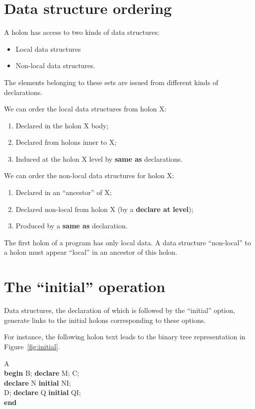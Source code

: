 \documentclass[openany,nobib]{tufte-book}
\newcommand{\kw}[1]{{\bf #1}}
\begin{document}
\section{Data structure ordering}

A holon has access to two kinds of data structures:
\begin{itemize}
    \item[(a)] Local data structures
    \item[(b)] Non-local data structures.
\end{itemize}
The elements belonging to these sets are issued from different kinds of
declarations.

We can order the local data structures from holon X:
\begin{enumerate}
    \item Declared in the holon X body;
    \item Declared from holons inner to X;
    \item Induced at the holon X level by \kw{same as} declarations.
\end{enumerate}

We can order the non-local data structures for holon X:
\begin{enumerate}
    \item Declared in an ``ancestor'' of X;
    \item Declared non-local from holon X (by a \kw{declare at level});
    \item Produced by a \kw{same as} declaration.
\end{enumerate}

The first holon of a program has only local data. A data structure
``non-local'' to a holon must appear ``local'' in an ancestor of this holon.

\section{The ``initial'' operation}

\medskip\noindent
Data structures, the declaration of which is followed by the ``initial''
option, generate links to the initial holons corresponding to these options.

For instance, the following holon text leads to the binary tree representation
in Figure~\ref{fig:initial}.

\medskip

\-\hspace{0.8cm} A\\
\-\hspace{0.8cm} \kw{begin} B; \kw{declare} M; C;\\
\-\hspace{2cm} \kw{declare} N \kw{initial} NI;\\
\-\hspace{2.5cm} D; \kw{declare} Q \kw{initial} QI;\\
\-\hspace{1.2cm} \kw{end}\\
\end{document}
